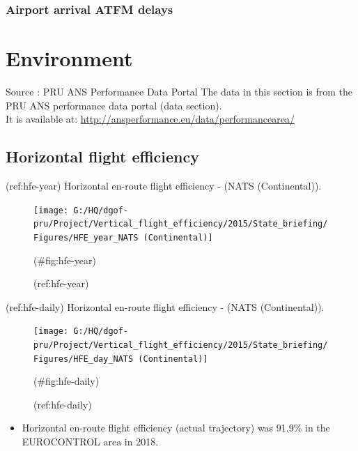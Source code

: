 \documentclass[]{article}
\providecommand{\tightlist}{%
  \setlength{\itemsep}{0pt}\setlength{\parskip}{0pt}}
\begin{document}
\hypertarget{airport-arrival-atfm-delays-1}{%
\subsubsection{Airport arrival ATFM delays}\label{airport-arrival-atfm-delays-1}}

\hypertarget{environment-1}{%
\section{Environment}\label{environment-1}}

Source : PRU ANS Performance Data Portal
The data in this section is from the PRU ANS performance data portal (data section).\\
It is available at: \url{http://ansperformance.eu/data/performancearea/}

\hypertarget{horizontal-flight-efficiency}{%
\subsection{Horizontal flight efficiency}\label{horizontal-flight-efficiency}}

(ref:hfe-year) Horizontal en-route flight efficiency - (NATS (Continental)).

\begin{figure}

{\centering \texttt{[image: G:/HQ/dgof-pru/Project/Vertical\_flight\_efficiency/2015/State\_briefing/Figures/HFE\_year\_NATS (Continental)]} 

}

\caption{(ref:hfe-year)}(\#fig:hfe-year)
\end{figure}

(ref:hfe-daily) Horizontal en-route flight efficiency - (NATS (Continental)).

\begin{figure}

{\centering \texttt{[image: G:/HQ/dgof-pru/Project/Vertical\_flight\_efficiency/2015/State\_briefing/Figures/HFE\_day\_NATS (Continental)]} 

}

\caption{(ref:hfe-daily)}(\#fig:hfe-daily)
\end{figure}

\begin{itemize}
\tightlist
\item
  Horizontal en-route flight efficiency (actual trajectory) was 91.9\%
  in the EUROCONTROL area in 2018.
\end{itemize}
\end{document}

